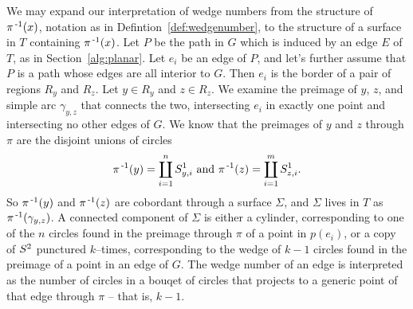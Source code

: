 \begin{rmk}
  We may expand our interpretation of wedge numbers from the structure of $\pi^{\,\text{-}1}(x)$, notation as in Defintion~\ref{def:wedgenumber}, to the structure of a surface in $T$ containing $\pi^{\,\text{-}1}(x)$.
  Let $P$ be the path in $G$ which is induced by an edge $E$ of $T$, as in Section~\ref{alg:planar}.
  Let $e_i$ be an edge of $P$, and let's further assume that $P$ is a path whose edges are all interior to $G$.
  Then $e_i$ is the border of a pair of regions $R_y$ and $R_z$.
  Let $y\in R_y$ and $z\in R_z$.
  We examine the preimage of $y$, $z$, and simple arc $\gamma_{y,z}$ that connects the two, intersecting $e_i$ in exactly one point and intersecting no other edges of $G$.
  We know that the preimages of $y$ and $z$ through $\pi$ are the disjoint unions of circles
  \[
    \pi^{\,\text{-}1}(y)=\coprod_{i=1}^{n} S^1_{y,i} \text{ and } \pi^{\,\text{-}1}(z) = \coprod_{i=1}^{m} S^1_{z,i}.
  \]
  So $\pi^{\,\text{-}1}(y)$ and $\pi^{\,\text{-}1}(z)$ are cobordant through a surface $\Sigma$, and $\Sigma$ lives in $T$ as $\pi^{\,\text{-}1}(\gamma_{y,z})$.
  A connected component of $\Sigma$ is either a cylinder, corresponding to one of the $n$ circles found in the preimage through $\pi$ of a point in $p(e_i)$, or a copy of $S^2$ punctured $k$--times, corresponding to the wedge of $k-1$ circles found in the preimage of a point in an edge of $G$.
  The wedge number of an edge is interpreted as the number of circles in a bouqet of circles that projects to a generic point of that edge through $\pi$ -- that is, $k-1$.
\end{rmk}
